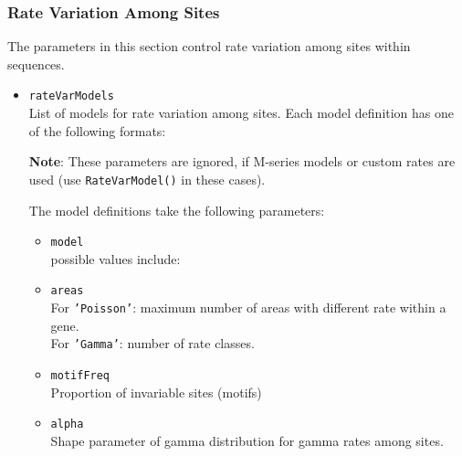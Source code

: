 \documentclass[11pt]{article}
\begin{document}
\subsubsection{Rate Variation Among Sites}
The parameters in this section control rate variation among sites within sequences.
\begin{itemize}
\item{\texttt{rateVarModels}} \hfill \\
List of models for rate variation among sites. Each model definition has one of the following formats:

\noindent \textbf{Note}: These parameters are ignored, if M-series models or custom rates are used (use \texttt{RateVarModel()} in these cases).

\noindent The model definitions take the following parameters:
\begin{itemize}
\item{\texttt{model}} \hfill \\
possible values include:
\item{\texttt{areas}} \hfill \\
For \texttt{'Poisson'}: maximum number of areas with different rate within a gene. \hfill \\
For \texttt{'Gamma'}: number of rate classes. \hfill \\
\item{\texttt{motifFreq}} \hfill \\
Proportion of invariable sites (motifs)
\item{\texttt{alpha}} \hfill \\
Shape parameter of gamma distribution for gamma rates among sites.
\end{itemize}


\end{itemize}
\end{document}
